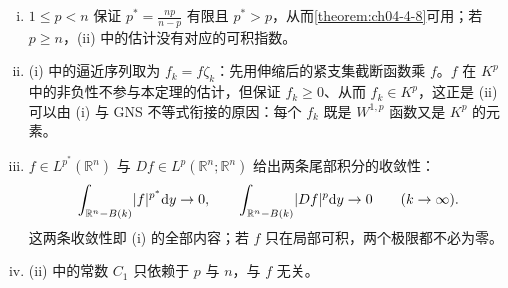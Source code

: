 \documentclass[../../main.tex]{subfiles}%
\begin{document}
\begin{remark}\label{remark:ch04-thm-4-12-条件}
\begin{enumerate}[(i)]
\item $1\leqslant p<n$ 保证 $p^*=\frac{np}{n-p}$ 有限且 $p^*>p$，从而\cref{theorem:ch04-4-8}可用；若 $p\geqslant n$，(ii) 中的估计没有对应的可积指数。%
\item (i) 中的逼近序列取为 $f_k=f\zeta_k$：先用伸缩后的紧支集截断函数乘 $f$。$f$ 在 $K^p$ 中的非负性不参与本定理的估计，但保证 $f_k\geqslant0$、从而 $f_k\in K^p$，这正是 (ii) 可以由 (i) 与 GNS 不等式衔接的原因：每个 $f_k$ 既是 $W^{1,p}$ 函数又是 $K^p$ 的元素。
\item $f\in L^{p^*}(\mathbb{R}^n)$ 与 $Df\in L^p(\mathbb{R}^n;\mathbb{R}^n)$ 给出两条尾部积分的收敛性：
\begin{align*}
\int_{\mathbb{R}^n-B(k)}\lvert f\rvert^{p^*}\mathrm{d} y\to0,\qquad\int_{\mathbb{R}^n-B(k)}\lvert Df\rvert^p\mathrm{d} y\to0\qquad(k\to\infty).
\end{align*}
这两条收敛性即 (i) 的全部内容；若 $f$ 只在局部可积，两个极限都不必为零。
\item (ii) 中的常数 $C_1$ 只依赖于 $p$ 与 $n$，与 $f$ 无关。
\end{enumerate}
\end{remark}
\end{document}
